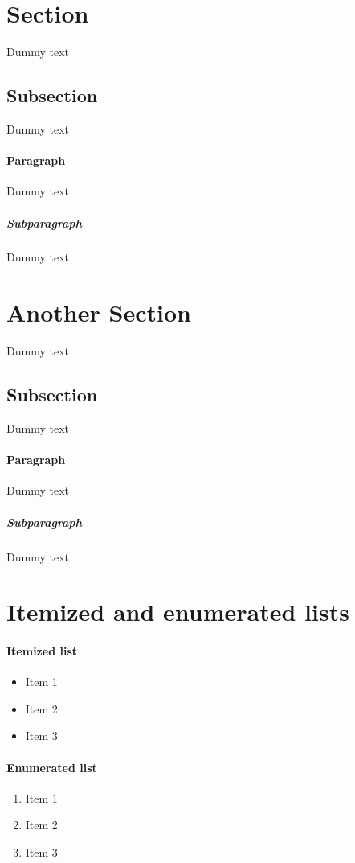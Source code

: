 \documentclass{article}
\begin{document}
\tableofcontents
\newpage

\section{Section}
Dummy text
\subsection{Subsection}
Dummy text
\paragraph{Paragraph}
Dummy text
\subparagraph{Subparagraph}
Dummy text

\section{Another Section}
Dummy text
\subsection{Subsection}
Dummy text
\paragraph{Paragraph}
Dummy text
\subparagraph{Subparagraph}
Dummy text

\section{Itemized and enumerated lists}
\paragraph{Itemized list}
\begin{itemize}
\item Item 1
\item Item 2
\item Item 3
\end{itemize}
\paragraph{Enumerated list}
\begin{enumerate}
\item Item 1
\item Item 2
\item Item 3
\end{enumerate}
\newpage
\end{document}
